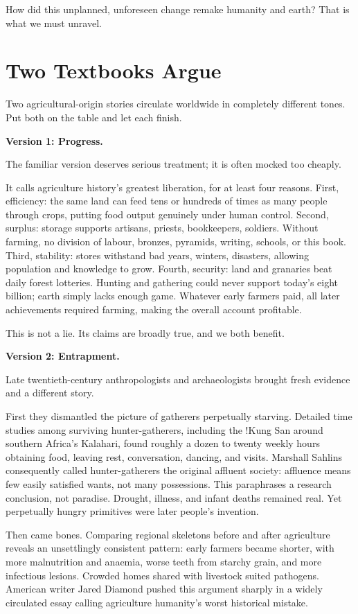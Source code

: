 How did this unplanned, unforeseen change remake humanity and earth? That is what we must unravel.

\section{Two Textbooks Argue}
Two agricultural-origin stories circulate worldwide in completely different tones. Put both on the table and let each finish.

\textbf{Version 1: Progress.}

The familiar version deserves serious treatment; it is often mocked too cheaply.

It calls agriculture history's greatest liberation, for at least four reasons. First, efficiency: the same land can feed tens or hundreds of times as many people through crops, putting food output genuinely under human control. Second, surplus: storage supports artisans, priests, bookkeepers, soldiers. Without farming, no division of labour, bronzes, pyramids, writing, schools, or this book. Third, stability: stores withstand bad years, winters, disasters, allowing population and knowledge to grow. Fourth, security: land and granaries beat daily forest lotteries. Hunting and gathering could never support today's eight billion; earth simply lacks enough game. Whatever early farmers paid, all later achievements required farming, making the overall account profitable.

This is not a lie. Its claims are broadly true, and we both benefit.

\textbf{Version 2: Entrapment.}

Late twentieth-century anthropologists and archaeologists brought fresh evidence and a different story.

First they dismantled the picture of gatherers perpetually starving. Detailed time studies among surviving hunter-gatherers, including the !Kung San around southern Africa's Kalahari, found roughly a dozen to twenty weekly hours obtaining food, leaving rest, conversation, dancing, and visits. Marshall Sahlins consequently called hunter-gatherers the original affluent society: affluence means few easily satisfied wants, not many possessions. This paraphrases a research conclusion, not paradise. Drought, illness, and infant deaths remained real. Yet perpetually hungry primitives were later people's invention.

Then came bones. Comparing regional skeletons before and after agriculture reveals an unsettlingly consistent pattern: early farmers became shorter, with more malnutrition and anaemia, worse teeth from starchy grain, and more infectious lesions. Crowded homes shared with livestock suited pathogens. American writer Jared Diamond pushed this argument sharply in a widely circulated essay calling agriculture humanity's worst historical mistake.


